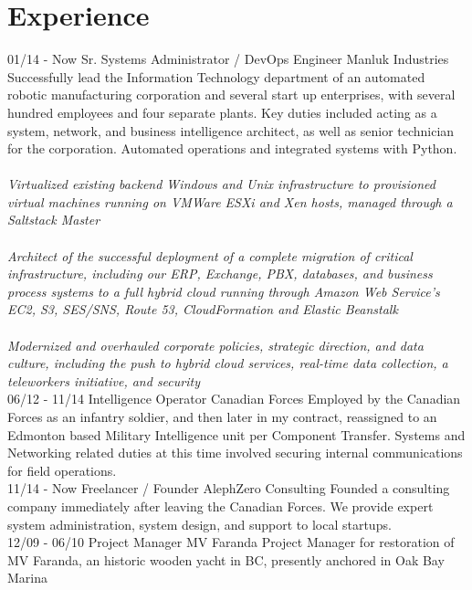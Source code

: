 \documentclass[]{vella-cv}
\begin{document}
\section{Experience}
\begin{entrylist}
  \entry
    {01/14 - Now}
    {Sr. Systems Administrator / DevOps Engineer}
    {Manluk Industries}
    {Successfully lead the Information Technology department of an automated robotic manufacturing corporation and several start up enterprises, with several hundred employees and four separate plants. Key duties included acting as a system, network, and business intelligence architect, as well as senior technician for the corporation. Automated operations and integrated systems with Python.\\\\
    \emph{Virtualized existing backend Windows and Unix infrastructure to provisioned virtual machines running on VMWare ESXi and Xen hosts, managed through a Saltstack Master\\\\}
    \emph{Architect of the successful deployment of a complete migration of critical infrastructure, including our ERP, Exchange, PBX, databases, and business process systems to a full hybrid cloud running through Amazon Web Service’s EC2, S3, SES/SNS, Route 53, CloudFormation and Elastic Beanstalk\\\\}
    \emph{Modernized and overhauled corporate policies, strategic direction, and data culture, including the push to hybrid cloud services, real-time data collection, a teleworkers initiative, and security\\}}
    \entry
    {06/12 - 11/14}
    {Intelligence Operator}
    {Canadian Forces}
    {Employed by the Canadian Forces as an infantry soldier, and then later in my contract, reassigned to an Edmonton based Military Intelligence unit per Component Transfer. Systems and Networking related duties at this time involved securing internal communications for field operations.\\}
    \entry
    {11/14 - Now}
    {Freelancer / Founder}
    {AlephZero Consulting}
    {Founded a consulting company immediately after leaving the Canadian Forces. We provide expert system administration, system design, and support to local startups.\\}
    \entry
    {12/09 - 06/10}
    {Project Manager}
    {MV Faranda}
    {Project Manager for restoration of MV Faranda, an historic wooden yacht in BC, presently anchored in Oak Bay Marina}
\end{entrylist}
\end{document}
